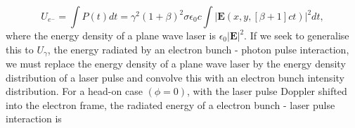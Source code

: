 \documentclass[../main.tex]{subfiles}
\begin{document}
\begin{equation}
U_{e^{-}} = \int P\left(t\right)dt = \gamma^{2}\left(1+\beta\right)^{2}\sigma\epsilon_{0}c\int\lvert\mathbf{E}\left(x,y,\left[\beta+1\right]ct\right)\rvert^{2}dt,
\label{eq:electron_radiated_energy}
\end{equation}
where the energy density of a plane wave laser is $\epsilon_{0}\lvert\mathbf{E}\rvert^{2}$. If we seek to generalise this to $U_{\gamma}$, the energy radiated by an electron bunch - photon pulse interaction, we must replace the energy density of a plane wave laser by the energy density distribution of a laser pulse and convolve this with an electron bunch intensity distribution. For a head-on case $\left(\phi=0\right)$, with the laser pulse Doppler shifted into the electron frame, the radiated energy of a electron bunch - laser pulse interaction is    
\end{document}

